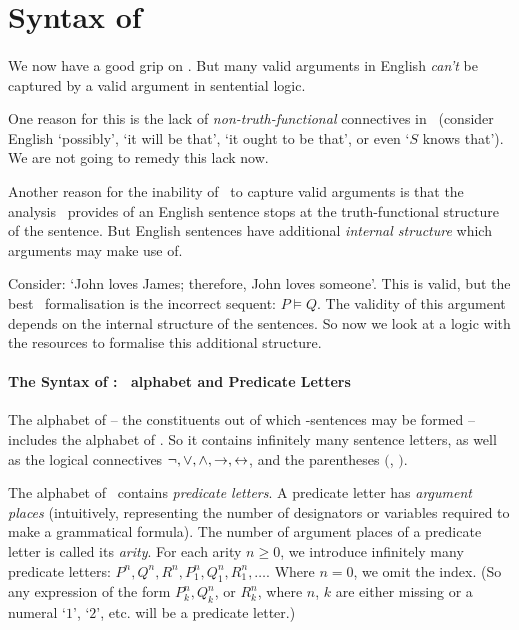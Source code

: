 




\section{Syntax of \ltwo}\label{ltwo}
\paragraph{\ltwo}

We now have a good grip on \lone. But many valid arguments in English \emph{can't} be captured by a valid argument in sentential logic. 

 One reason for this is the lack of \emph{non-truth-functional} connectives in \lone\ (consider English `possibly', `it will be that', `it ought to be that', or even `$S$ knows that'). We are not going to remedy this lack now. 

Another reason for the inability of \lone\ to capture valid arguments is that the analysis \lone\ provides of an English sentence stops at the truth-functional structure of the sentence. But English sentences have additional \emph{internal structure} which arguments may make use of.

Consider: `John loves James; therefore, John loves someone'. This is valid, but the best \lone\ formalisation is the incorrect sequent: $P\vDash Q$. The validity of this argument depends on the internal structure of the sentences. So now we look at a logic with the resources to formalise this additional structure.

\paragraph{The Syntax of \ltwo: \lone\ alphabet and Predicate Letters}

The alphabet of \ltwo – the constituents out of which \ltwo-sentences may be formed – includes the alphabet of \lone. So it contains infinitely many sentence letters, as well as the logical connectives $\neg,\vee,\wedge,\to,
\leftrightarrow$, and the parentheses $($, $)$.

The alphabet of \ltwo\ contains  \emph{predicate letters}. A predicate letter has \emph{argument places} (intuitively, representing the number of designators or variables required to make a grammatical formula). The number of argument places of a predicate letter is called its \emph{arity}. For each arity $n \geqslant 0$, we introduce infinitely many predicate letters: $P^{n},Q^{n},R^{n},P^{n}_{1},Q^{n}_{1},R^{n}_{1},\ldots$. Where $n=0$, we omit the index. (So any expression of the form $P^{n}_{k}, Q^{n}_{k}$, or $R^{n}_{k}$, where $n$, $k$ are either missing or a numeral `$1$', `$2$', etc. will be a predicate letter.)

